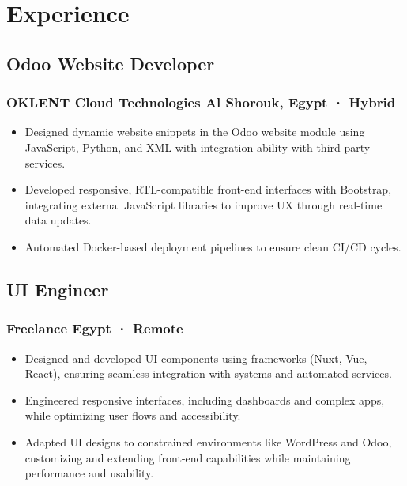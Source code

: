 \section*{Experience}
%
%
%
%
%
%
%
%
\subsection*{
	Odoo Website Developer
	\hspace*{\fill}
}
\subsubsection*{
	OKLENT Cloud Technologies
	\hspace*{\fill}
	\smallFormat Al Shorouk, Egypt · Hybrid
}
\begin{itemize}
	\item Designed dynamic website snippets in the Odoo website module using JavaScript, Python, and XML with integration ability with third-party services.
	\item Developed responsive, RTL-compatible front-end interfaces with Bootstrap, integrating external JavaScript libraries to improve UX through real-time data updates.
	\item Automated Docker-based deployment pipelines to ensure clean CI/CD cycles.
\end{itemize}
%
%
%
%
\subsection*{
	UI Engineer
	\hspace*{\fill}
}
\subsubsection*{
	Freelance
	\hspace*{\fill}
	\smallFormat Egypt · Remote
}
\begin{itemize}
	\item Designed and developed UI components using frameworks (Nuxt, Vue, React), ensuring seamless integration with systems and automated services.
	\item Engineered responsive interfaces, including dashboards and complex apps, while optimizing user flows and accessibility.
	\item Adapted UI designs to constrained environments like WordPress and Odoo, customizing and extending front-end capabilities while maintaining performance and usability.
\end{itemize}
